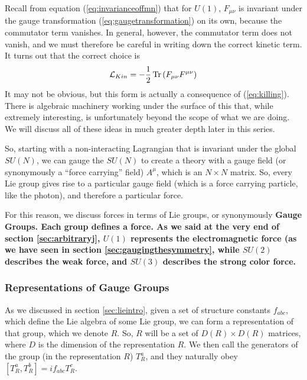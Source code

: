 \documentclass[12pt,epsf]{article}
\def\Tr{\mathop{\rm Tr \,} \nolimits}
\begin{document}
Recall from equation (\ref{eq:invarianceoffmn}) that for $U(1)$,
$F_{\mu \nu}$ is invariant under the gauge transformation
(\ref{eq:gaugetransformation}) on its own, because the commutator term
vanishes.  In general, however, the commutator term does not vanish,
and we must therefore be careful in writing down the correct kinetic
term.  It turns out that the correct choice is 
\begin{eqnarray}
\mathcal{L}_{Kin} = -{1\over 2} \Tr(F_{\mu \nu}F^{\mu \nu})
\label{eq:fullkinterm}
\end{eqnarray}
It may not be obvious, but this form is actually a consequence of
(\ref{eq:killing}).  There is algebraic machinery working under the
surface of this that, while extremely interesting, is unfortunately
beyond the scope of what we are doing.	We will discuss all of these
ideas in much greater depth later in this series.  

So, starting with a non-interacting Lagrangian that is invariant under
the global $SU(N)$, we can gauge the $SU(N)$ to create a theory with a
gauge field (or synonymously a ``force carrying'' field) $A^{\mu}$, which
is an $N\times N$ matrix.  So, every Lie group gives rise to a
particular gauge field (which is a force carrying particle, like the
photon), and therefore a particular force.  

For this reason, we discuss forces in terms of Lie groups, or
synonymously \bf Gauge Groups\rm.  Each group defines a force.	As we
said at the very end of section \ref{sec:arbitraryj}, $U(1)$ represents
the electromagnetic force (as we have seen in section
\ref{sec:gaugingthesymmetry}, while $SU(2)$ describes the weak force,
and $SU(3)$ describes the strong color force.  

\subsubsection{Representations of Gauge Groups}

As we discussed in section \ref{sec:lieintro}, given a set of structure
constants $f_{abc}$, which define the Lie algebra of some Lie group, we
can form a representation of that group, which we denote $R$.  So, $R$
will be a set of $D(R)\times D(R)$ matrices, where $D$ is the dimension
of the representation $R$.  We then call the generators of the group
(in the representation $R$) $T^a_R$, and they naturally obey
$[T^a_R,T^b_R] = if_{abc}T^c_R$.  
\end{document}
